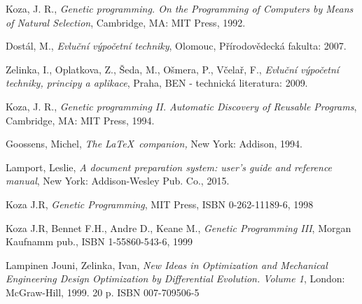 \documentclass[bc,male,java,dept460]{diploma}		%
\begin{document}
\begin{thebibliography}{99}

 Koza, J. R.,
\textit{Genetic programming. On the Programming of Computers by Means of Natural Selection},
Cambridge, MA: MIT Press, 1992.

 Dostál, M.,
\textit{Evluční výpočetní techniky},
Olomouc, Přírodovědecká fakulta: 2007.

 Zelinka, I., Oplatkova, Z., Šeda, M., Ošmera, P., Včelař, F.,
\textit{Evluční výpočetní techniky, principy a aplikace},
Praha, BEN - technická literatura: 2009.

 Koza, J. R.,
\textit{Genetic programming II. Automatic Discovery of Reusable Programs},
Cambridge, MA: MIT Press, 1994.

 Goossens, Michel,
\textit{The \LaTeX\ companion,} New York: Addison, 1994.

 Lamport, Leslie,
\textit{A document preparation system: user's guide and reference manual},
New York: Addison-Wesley Pub. Co., 2015.

 Koza J.R, 
\textit{Genetic Programming},
MIT Press, ISBN 0-262-11189-6, 1998

 Koza J.R, Bennet F.H., Andre D., Keane M.,
\textit{Genetic Programming III},
Morgan Kaufnamm pub., ISBN 1-55860-543-6, 1999

 Lampinen Jouni, Zelinka, Ivan,
\textit{New Ideas in Optimization and Mechanical Engineering Design Optimization by Differential Evolution. Volume 1},
London: McGraw-Hill, 1999. 20 p. ISBN 007-709506-5

\end{thebibliography}
\end{document}

